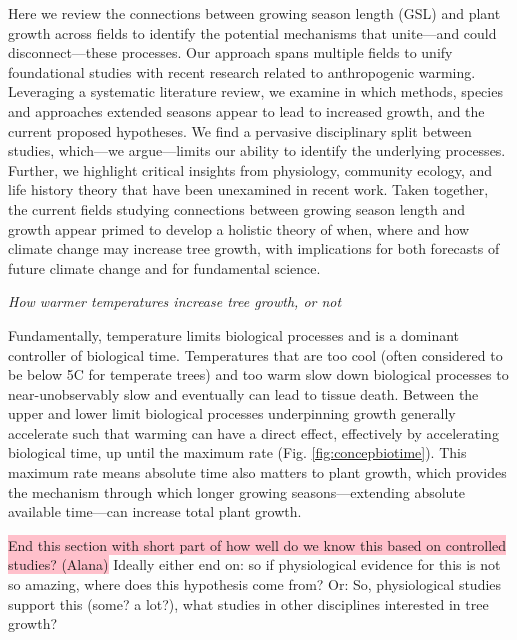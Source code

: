 \documentclass[11pt]{article}
\begin{document}
Here we review the connections between growing season length (GSL) and plant growth across fields to identify the potential mechanisms that unite---and could disconnect---these processes. Our approach spans multiple fields to unify foundational studies with recent research related to anthropogenic warming. Leveraging a systematic literature review, we examine in which methods, species and approaches extended seasons appear to lead to increased growth, and the current proposed hypotheses. We find a pervasive disciplinary split between studies, which---we argue---limits our ability to identify the underlying processes. Further, we highlight critical insights from physiology, community ecology, and life history theory that have been unexamined in recent work. Taken together, the current fields studying connections between growing season length and growth appear primed to develop a holistic theory of when, where and how climate change may increase tree growth, with implications for both forecasts of future climate change and for fundamental science.
  
\emph{How warmer temperatures increase tree growth, or not}

Fundamentally, temperature limits biological processes and is a dominant controller of biological time. Temperatures that are too cool (often considered to be below 5\degree C for temperate trees) and too warm \citep[an area of active research][, see also Fig. \ref{fig:temperaturecomplex}]{martinez2008hot,cabon2022cross} slow down biological processes to near-unobservably slow and eventually can lead to tissue death. Between the upper and lower limit biological processes underpinning growth generally accelerate such that warming can have a direct effect, effectively by accelerating biological time, up until the maximum rate (Fig. \ref{fig:concepbiotime}). This maximum rate means absolute time also matters to plant growth, which provides the mechanism through which longer growing seasons---extending absolute available time---can increase total plant growth. %
 
\colorbox{pink}{End this section with short part of how well do we know this based on controlled studies? (Alana)} Ideally either end on: so if physiological evidence for this is not so amazing, where does this hypothesis come from? Or: So, physiological studies support this (some? a lot?), what studies in other disciplines interested in tree growth?
\end{document}
